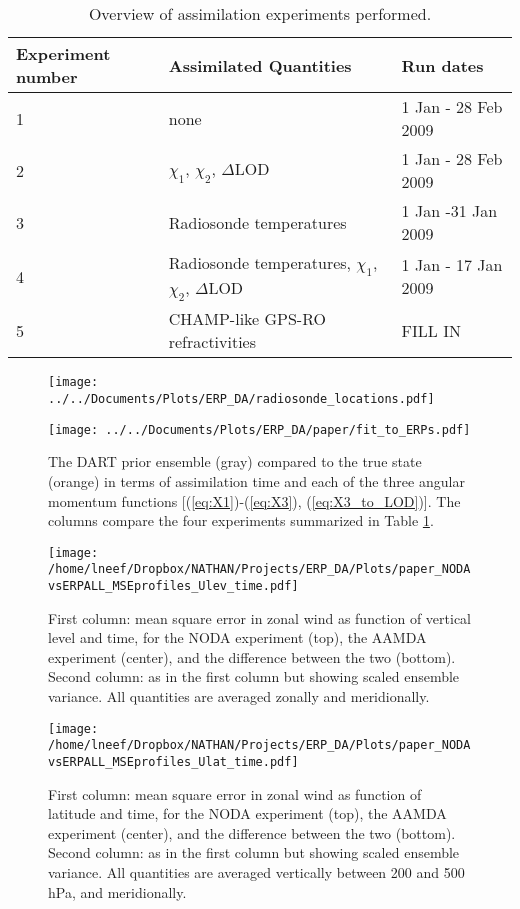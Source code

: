 
\begin{table}
\caption{Overview of assimilation experiments performed.}
\centering
\begin{tabular}{p{2cm}p{5cm}p{4cm}}
Experiment number &  Assimilated Quantities  & Run dates \\
\hline
1 &  none	& 1 Jan - 28 Feb 2009 \\
2 &  $\chi_1$, $\chi_2$, $\Delta$LOD		& 1 Jan - 28 Feb 2009 \\
3 &  Radiosonde temperatures	& 1 Jan -31 Jan 2009	\\
4 &  Radiosonde temperatures, $\chi_1$, $\chi_2$, $\Delta$LOD	& 1 Jan - 17 Jan 2009\\
5 & \textcolor{unsure}{CHAMP-like GPS-RO refractivities} & \textcolor{alert}{FILL IN}	\\
\hline
\end{tabular}
\label{tab:expts}
\end{table}

 \begin{figure}
\texttt{[image: ../../Documents/Plots/ERP\_DA/radiosonde\_locations.pdf]} 
 \caption{  }
 \label{fig:RS}
\end{figure}

 \begin{figure}
\texttt{[image: ../../Documents/Plots/ERP\_DA/paper/fit\_to\_ERPs.pdf]} 
 \caption{ The DART prior ensemble (gray) compared to the true state (orange) in terms of assimilation time and each of the three angular momentum functions [(\ref{eq:X1})-(\ref{eq:X3}), (\ref{eq:X3_to_LOD})].  The columns compare the four experiments summarized in Table \ref{tab:expts}.  }
 \label{fig:fit_to_ERPs}
\end{figure}

 \begin{figure}
 \texttt{[image: /home/lneef/Dropbox/NATHAN/Projects/ERP\_DA/Plots/paper\_NODAvsERPALL\_MSEprofiles\_Ulev\_time.pdf]}
 \caption{First column: mean square error in zonal wind as function of vertical level and time, for the NODA experiment (top), the AAMDA experiment (center), and the difference between the two (bottom). Second column: as in the first column but showing scaled ensemble variance. All quantities are averaged zonally and meridionally.} 
 \label{fig:MSEprofiles}
\end{figure}

 \begin{figure}
 \texttt{[image: /home/lneef/Dropbox/NATHAN/Projects/ERP\_DA/Plots/paper\_NODAvsERPALL\_MSEprofiles\_Ulat\_time.pdf]}
 \caption{First column: mean square error in zonal wind as function of latitude and time, for the NODA experiment (top), the AAMDA experiment (center), and the difference between the two (bottom). Second column: as in the first column but showing scaled ensemble variance. All quantities are averaged vertically between 200 and 500 hPa, and meridionally.} 
 \label{fig:MSEsurface}
\end{figure}




